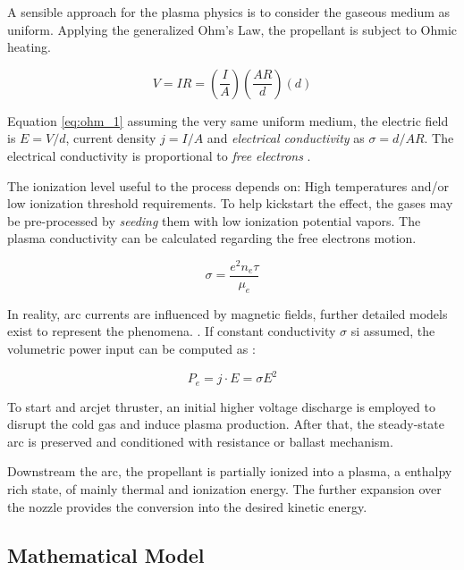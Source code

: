 A sensible approach for the plasma physics is to consider the gaseous medium as uniform. Applying the generalized Ohm's Law, the propellant is subject to Ohmic heating. \cite{rpe_book}

\begin{equation}
\label{eq:ohm_1}
    V = IR = \left( \frac{I}{A} \right) \left( \frac{AR}{d} \right) (d)
\end{equation}

Equation \eqref{eq:ohm_1} assuming the very same uniform medium, the electric field is $E = V / d$, current density $j = I/A$ and \textit{electrical conductivity} as $\sigma = d / AR$. The electrical conductivity is proportional to \textit{free electrons} \cite{rpe_book}. 

The ionization level useful to the process depends on: High temperatures and/or low ionization threshold requirements. To help kickstart the effect, the gases may be pre-processed by \textit{seeding} them with low ionization potential vapors. The plasma conductivity can be calculated regarding the free electrons motion.


\begin{equation}
\label{eq:sigma_condut}
    \sigma = \frac{e^2n_e\tau}{\mu_e} 
\end{equation}

In reality, arc currents are influenced by magnetic fields,  further detailed models exist to represent the phenomena. \cite{rpe_book}. If constant conductivity $\sigma$ si assumed, the volumetric power input can be computed as \cite{pep_book}:

\begin{equation}
\label{eq:arcjet_pele_comp}
    P_e = j \cdot E = \sigma E^2
\end{equation}

To start and arcjet thruster, an initial higher voltage discharge is employed to disrupt the cold gas and induce plasma production. After that, the steady-state arc is preserved and conditioned with resistance or ballast mechanism. \cite{rpe_book}

Downstream the arc, the propellant is partially ionized into a plasma, a enthalpy rich state, of mainly thermal and ionization energy. The further expansion over the nozzle provides the conversion into the desired kinetic energy.

\subsection{Mathematical Model}

